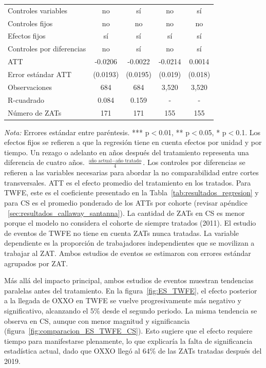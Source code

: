 \documentclass{article}
\begin{document}
\begin{table}[H]
\begin{tabular}{lcccc}
Controles variables & no & sí & no & sí \\
Controles fijos & no & no & no & no \\
Efectos fijos & sí & sí & sí & sí \\
Controles por diferencias & no & sí & no & sí \\
ATT & -0.0206 & -0.0022 & -0.0214 & 0.0014 \\
Error estándar ATT & (0.0193) & (0.0195) & (0.019) & (0.018) \\
Observaciones & 684 & 684 & 3,520 & 3,520 \\
R-cuadrado & 0.084 & 0.159 & - & - \\
Número de ZATs & 171 & 171 & 155 & 155 \\
\hline
\end{tabular}
\parbox[t]{\textwidth}{%
\vspace{0.5em}
\footnotesize{\textit{Nota:} Errores estándar entre paréntesis. *** p$<$0.01, ** p$<$0.05, * p$<$0.1. 
Los efectos fijos se refieren a que la regresión tiene en cuenta efectos por unidad y por tiempo. 
Un rezago o adelanto en años después del tratamiento representa una diferencia de cuatro años.
$\frac{\text{año actual} - \text{año tratado}}{4}$.
Los controles por diferencias se refieren a las variables necesarias para abordar la no comparabilidad entre cortes transversales.
ATT es el efecto promedio del tratamiento en los tratados. 
Para TWFE, este es el coeficiente presentado en la Tabla~\ref{tab:resultados_regresion} y para CS es el promedio ponderado de los ATTs por cohorte (revisar apéndice ~\ref{sec:resultados_callaway_santanna}).
La cantidad de ZATs en CS es menor porque el modelo no considera el cohorte de siempre tratados (2011).
El estudio de eventos de TWFE no tiene en cuenta ZATs nunca tratadas.
La variable dependiente es la proporción de trabajadores independientes que se movilizan a trabajar al ZAT.
Ambos estudios de eventos se estimaron con errores estándar agrupados por ZAT. 
}}
\end{table}

Más allá del impacto principal, ambos estudios de eventos muestran tendencias paralelas antes del tratamiento. 
En la figura~\ref{fig:ES_TWFE}, el efecto posterior a la llegada de OXXO en TWFE se vuelve progresivamente más negativo y significativo, alcanzando el 5\% desde el segundo periodo. 
La misma tendencia se observa en CS, aunque con menor magnitud y significancia (figura~\ref{fig:comparacion_ES_TWFE_CS}). 
Esto sugiere que el efecto requiere tiempo para manifestarse plenamente, lo que explicaría la falta de significancia estadística actual, dado que OXXO llegó al 64\% de las ZATs tratadas después del 2019. \\
\end{document}
